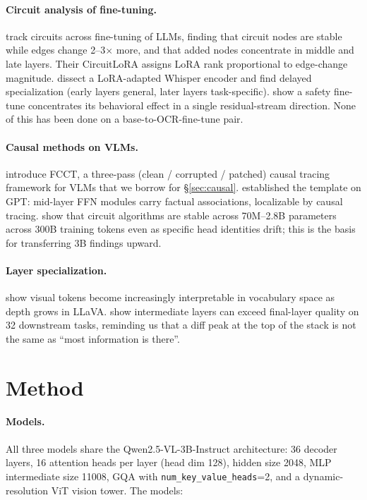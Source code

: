 \documentclass[10pt,twocolumn,letterpaper]{article}
\begin{document}
\paragraph{Circuit analysis of fine-tuning.} \citet{wang2025circuitlora} track circuits across fine-tuning of LLMs, finding that circuit nodes are stable while edges change 2--3$\times$ more, and that added nodes concentrate in middle and late layers. Their CircuitLoRA assigns LoRA rank proportional to edge-change magnitude. \citet{ma2025lorawhisper} dissect a LoRA-adapted Whisper encoder and find delayed specialization (early layers general, later layers task-specific). \citet{arditi2024refusal} show a safety fine-tune concentrates its behavioral effect in a single residual-stream direction. None of this has been done on a base-to-OCR-fine-tune pair.

\paragraph{Causal methods on VLMs.} \citet{li2025fcct} introduce FCCT, a three-pass (clean / corrupted / patched) causal tracing framework for VLMs that we borrow for \S\ref{sec:causal}. \citet{meng2022rome} established the template on GPT: mid-layer FFN modules carry factual associations, localizable by causal tracing. \citet{tigges2024circuitscale} show that circuit algorithms are stable across 70M--2.8B parameters across 300B training tokens even as specific head identities drift; this is the basis for transferring 3B findings upward.

\paragraph{Layer specialization.} \citet{neo2024visualinfo} show visual tokens become increasingly interpretable in vocabulary space as depth grows in LLaVA. \citet{skean2025layerbylayer} show intermediate layers can exceed final-layer quality on 32 downstream tasks, reminding us that a diff peak at the top of the stack is not the same as ``most information is there''.

\section{Method}
\label{sec:method}

\paragraph{Models.} All three models share the Qwen2.5-VL-3B-Instruct architecture: 36 decoder layers, 16 attention heads per layer (head dim 128), hidden size 2048, MLP intermediate size 11008, GQA with \texttt{num\_key\_value\_heads}=2, and a dynamic-resolution ViT vision tower. The models:
\end{document}

